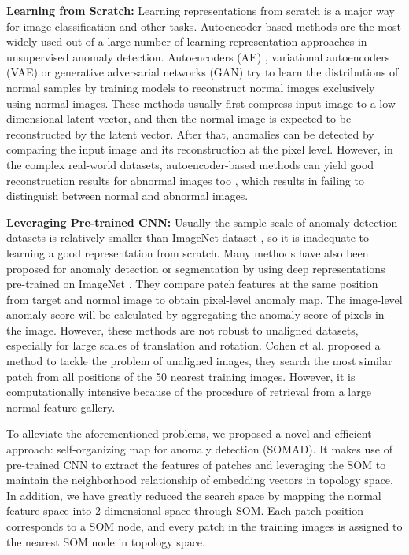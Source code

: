 \documentclass{article}
\begin{document}
\textbf{Learning from Scratch:}
Learning representations from scratch is a major way for image classification and other tasks. Autoencoder-based methods are the most widely used out of a large number of learning representation approaches in unsupervised anomaly detection.
Autoencoders (AE) \cite{MvtecAD,Student,MemoryAE,AE2,AE3,Mirrored_AE,AE4,AE5}, variational autoencoders (VAE) \cite{VAE1,VAE2,VAE3} or generative adversarial networks (GAN) \cite{Ganomaly,GAN1,fAnoGAN,superpixel_inpainting} try to learn the distributions of normal samples by training models to reconstruct normal images exclusively using normal images. These methods usually first compress input image to a low dimensional latent vector, and then the normal image is expected to be reconstructed by the latent vector. After that, anomalies can be detected by comparing the input image and its reconstruction at the pixel level.  
However, in the complex real-world datasets, autoencoder-based methods can yield good reconstruction results for abnormal images too \cite{Perera2019OCGANON}, which results in failing to distinguish between normal and abnormal images.

\textbf{Leveraging Pre-trained CNN:}
Usually the sample scale of anomaly detection datasets is relatively smaller than ImageNet dataset \cite{ImageNet}, so it is inadequate to learning a good representation from scratch. 
Many methods have also been proposed for anomaly detection \cite{Ma_distance,Bergman2020DeepNN,AggregatingDetection,reiss2020panda} or segmentation \cite{Student, PatchSVDD, Padim,ModelingPercep,rudolph2020differnet} by using deep representations pre-trained on ImageNet \cite{ImageNet}. They compare patch features at the same position from target and normal image to obtain pixel-level anomaly map. The image-level anomaly score will be calculated by aggregating the anomaly score of pixels in the image. 
However, these methods are not robust to unaligned datasets, especially for large scales of translation and rotation. 
Cohen et al. \cite{SPADE} proposed a method to tackle the problem of unaligned images, they search the most similar patch from all positions of the 50 nearest training images. However, it is computationally intensive because of the procedure of retrieval from a large normal feature gallery. 

To alleviate the aforementioned problems, we proposed a novel and efficient approach: self-organizing map for anomaly detection (SOMAD). It makes use of pre-trained CNN to extract the features of patches and leveraging the SOM to maintain the neighborhood relationship of embedding vectors in topology space. In addition, we have greatly reduced the search space by mapping the normal feature space into 2-dimensional space through SOM. Each patch position corresponds to a SOM node, and every patch in the training images is assigned to the nearest SOM node in topology space. 
\end{document}
